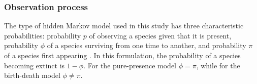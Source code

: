 


\subsubsection*{Observation process}
The type of hidden Markov model used in this study has three characteristic probabilities: probability \(p\) of observing a species given that it is present, probability \(\phi\) of a species surviving from one time to another, and probability \(\pi\) of a species first appearing \citep{Royle2008}. In this formulation, the probability of a species becoming extinct is \(1 - \phi\). For the pure-presence model \(\phi = \pi\), while for the birth-death model \(\phi \neq \pi\).

